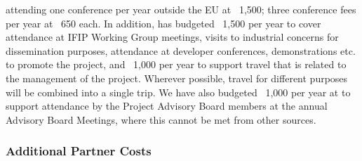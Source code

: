 \documentclass[a4paper,11pt]{article}
\begin{document}
attending one conference per year outside the EU at \euros{}~1,500;
three conference fees per year at \euros{}~650 each.
%
\noindent
In addition, \SAshort{} has budgeted \euros{}~1,500 per year to cover attendance at
IFIP Working Group meetings, visits to industrial concerns for dissemination purposes,
attendance at developer conferences, demonstrations etc. to promote the project,
and \euros~1,000 per year to support travel that is related to the management of the
project.
Wherever possible, travel for different purposes will be
combined into a single trip. We have also budgeted \euros~1,000
per year at \SAshort{} to support attendance by the Project Advisory Board members at
the annual Advisory Board Meetings, where this cannot be met from other sources.


\subsubsection{Additional Partner Costs}
\vspace{-6pt}
\end{document}
